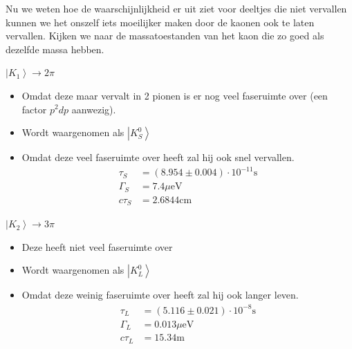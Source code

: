 \documentclass[../main.tex]{subfiles}
\begin{document}
Nu we weten hoe de waarschijnlijkheid er uit ziet voor deeltjes die niet vervallen kunnen we het onszelf iets moeilijker maken door de kaonen ook te laten vervallen. Kijken we naar de massatoestanden van het kaon die zo goed als dezelfde massa hebben.\\
\begin{minipage}[c]{0.5\textwidth}
    \begin{center}
        $\left| K_1 \right> \rightarrow 2\pi$
    \end{center}
    \begin{itemize}
        \item Omdat deze maar vervalt in 2 pionen is er nog veel faseruimte over (een factor $p^2 dp$ aanwezig).
        \item Wordt waargenomen als $\left| K_S^0 \right>$
        \item Omdat deze veel faseruimte over heeft zal hij ook snel vervallen.
            \begin{equation}
                \begin{aligned}
                    \label{eq:verval_ks}
                    \tau_{S}&=(8.954 \pm 0.004) \cdot 10^{-11} \text{s}\\
                    \Gamma_S &= 7.4\mu\text{eV}\\
                    c\tau_S &= 2.6844\text{cm}
                \end{aligned}
            \end{equation}
    \end{itemize}
\end{minipage}\noindent
\begin{minipage}[c]{0.5\textwidth}
    \begin{center}
        $\left| K_2 \right> \rightarrow 3\pi$
    \end{center}
    \begin{itemize}
        \item Deze heeft niet veel faseruimte over
        \item Wordt waargenomen als $\left| K_L^0 \right>$
        \item Omdat deze weinig faseruimte over heeft zal hij ook langer leven.
            \begin{equation}
                \begin{aligned}
                    \label{eq:verval_ks}
                    \tau_{L}&=(5.116 \pm 0.021) \cdot 10^{-8} \text{s}\\
                    \Gamma_L &= 0.013\mu\text{eV}\\
                    c\tau_L &= 15.34\text{m}
                \end{aligned}
            \end{equation}
    \end{itemize}
\end{minipage}
\end{document}
